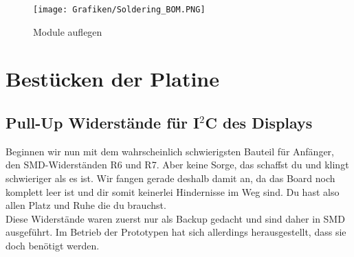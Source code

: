 \documentclass[12pt, a4paper]{article}		%
\begin{document}
\begin{figure}[H]
	\centering
		\texttt{[image: Grafiken/Soldering\_BOM.PNG]}
	\caption{Module auflegen}
	\label{fig:soldering_bom}
\end{figure}


\newpage
\section{Bestücken der Platine}
\subsection{Pull-Up Widerstände für I$^2$C des Displays}

Beginnen wir nun mit dem wahrscheinlich schwierigsten Bauteil für Anfänger, den SMD-Widerständen R6 und R7. Aber keine Sorge, das schaffst du und klingt schwieriger als es ist. Wir fangen gerade deshalb damit an, da das Board noch komplett leer ist und dir somit keinerlei Hindernisse im Weg sind. Du hast also allen Platz und Ruhe die du brauchst.
\\ \newline
Diese Widerstände waren zuerst nur als Backup gedacht und sind daher in SMD ausgeführt. Im Betrieb der Prototypen hat sich allerdings herausgestellt, dass sie doch benötigt werden.\\ \newline
\end{document}
